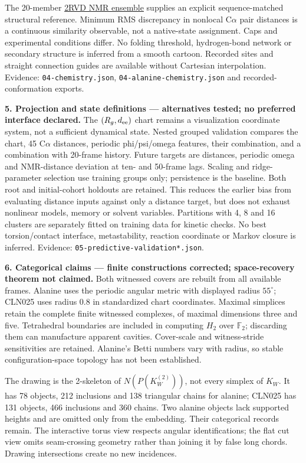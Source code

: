 \documentclass[11pt]{article}
\begin{document}
The 20-member \href{https://www.rcsb.org/structure/2RVD}{2RVD NMR ensemble}
supplies an explicit sequence-matched structural reference. Minimum RMS
discrepancy in nonlocal C$\alpha$ pair distances is a continuous similarity
observable, not a native-state assignment. Caps and experimental conditions
differ. No folding threshold, hydrogen-bond network or secondary structure
is inferred from a smooth cartoon. Recorded sites and straight connection
guides are available without Cartesian interpolation.
Evidence: \texttt{04-chemistry.json}, \texttt{04-alanine-chemistry.json}
and recorded-conformation exports.

\textbf{5. Projection and state definitions --- alternatives tested; no preferred interface declared.}
The $(R_g,d_{\rm ee})$ chart remains a visualization coordinate system,
not a sufficient dynamical state. Nested grouped validation compares the chart,
45 C$\alpha$ distances, periodic phi/psi/omega features, their combination,
and a combination with 20-frame history. Future targets are distances,
periodic omega and NMR-distance deviation at ten- and 50-frame lags.
Scaling and ridge-parameter selection use training groups only; persistence
is the baseline. Both root and initial-cohort holdouts are retained.
This reduces the earlier bias from evaluating distance inputs against only
a distance target, but does not exhaust nonlinear models, memory or solvent
variables. Partitions with 4, 8 and 16 clusters are separately fitted on
training data for kinetic checks. No best torsion/contact interface,
metastability, reaction coordinate or Markov closure is inferred.
Evidence: \texttt{05-predictive-validation*.json}.

\textbf{6. Categorical claims --- finite constructions corrected; space-recovery theorem not claimed.}
Both witnessed covers are rebuilt from all available frames. Alanine uses
the periodic angular metric with displayed radius $55^\circ$; CLN025 uses
radius 0.8 in standardized chart coordinates. Maximal simplices retain the
complete finite witnessed complexes, of maximal dimensions three and five.
Tetrahedral boundaries are included in computing $H_2$ over $\mathbb F_2$;
discarding them can manufacture apparent cavities. Cover-scale and
witness-stride sensitivities are retained. Alanine's Betti numbers vary
with radius, so stable configuration-space topology has not been established.

The drawing is the 2-skeleton of $N(P(K_W^{(2)}))$, not every simplex of $K_W$.
It has 78 objects, 212 inclusions and 138 triangular chains for alanine;
CLN025 has 131 objects, 466 inclusions and 360 chains. Two alanine objects
lack supported heights and are omitted only from the embedding. Their
categorical records remain. The interactive torus view respects angular
identifications; the flat cut view omits seam-crossing geometry rather than
joining it by false long chords. Drawing intersections create no new incidences.
\end{document}
